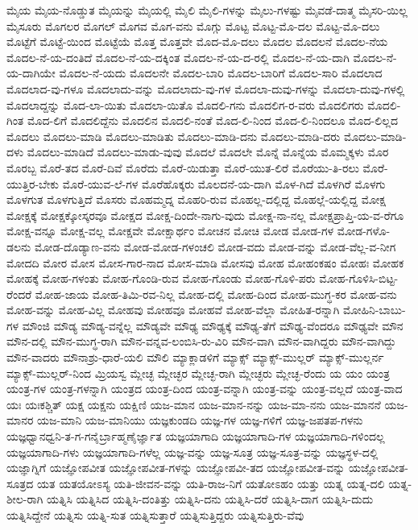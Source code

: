 {ಮೈಯ
ಮೈಯ-ನೊಡ್ಡುತ
ಮೈಯನ್ನು
ಮೈಯಲ್ಲಿ
ಮೈಲಿ
ಮೈಲಿ-ಗಳನ್ನು
ಮೈಲು-ಗಳಷ್ಟು
ಮೈವಡೆ-ದಾತ್ಮ
ಮೈಸರಿ-ಯಿಲ್ಲ
ಮೈಸೂರು
ಮೊಗಲರ
ಮೊಗಲ್
ಮೊಗವ
ಮೊಗ-ವನು
ಮೊಗ್ಗು
ಮೊಟ್ಟ
ಮೊಟ್ಟ-ಮೊ-ದಲ
ಮೊಟ್ಟ-ಮೊ-ದಲು
ಮೊಟ್ಟೆಗೆ
ಮೊಟ್ಟೆ-ಯಿಂದ
ಮೊಟ್ಟೆಯೆ
ಮೊತ್ತ
ಮೊತ್ತವೇ
ಮೊದ-ಮೊ-ದಲು
ಮೊದಲ
ಮೊದಲನೆ
ಮೊದಲ-ನೆಯ
ಮೊದಲ-ನೆ-ಯ-ದಂತಿದೆ
ಮೊದಲ-ನೆ-ಯ-ದಕ್ಕಿಂತ
ಮೊದಲ-ನೆ-ಯ-ದ-ರಲ್ಲಿ
ಮೊದಲ-ನೆ-ಯ-ದಾಗಿ
ಮೊದಲ-ನೆ-ಯ-ದಾಗಿಯೇ
ಮೊದಲ-ನೆ-ಯದು
ಮೊದಲನೇ
ಮೊದಲ-ಬಾರಿ
ಮೊದಲ-ಬಾರಿಗೆ
ಮೊದಲ-ಸಾರಿ
ಮೊದಲಾದ
ಮೊದಲಾದ-ವು-ಗಳೂ
ಮೊದಲಾದು-ವನ್ನು
ಮೊದಲಾದು-ವು-ಗಳ
ಮೊದಲಾ-ದುವು-ಗಳನ್ನು
ಮೊದಲಾ-ದುವು-ಗಳಲ್ಲಿ
ಮೊದಲಾದ್ದನ್ನು
ಮೊದ-ಲಾ-ಯಿತು
ಮೊದಲಾ-ಯಿತೊ
ಮೊದಲಿ-ಗನು
ಮೊದಲಿಗ-ರ-ವರು
ಮೊದಲಿಗರು
ಮೊದಲಿ-ಗಿಂತ
ಮೊದ-ಲಿಗೆ
ಮೊದಲಿದ್ದೆನು
ಮೊದಲಿನ
ಮೊದಲಿ-ನಂತೆ
ಮೊದ-ಲಿ-ನಿಂದ
ಮೊದ-ಲಿ-ನಿಂದಲೂ
ಮೊದ-ಲಿಲ್ಲದ
ಮೊದಲು
ಮೊದಲು-ಮಾಡಿ
ಮೊದಲು-ಮಾಡಿತು
ಮೊದಲು-ಮಾಡಿ-ದನು
ಮೊದಲು-ಮಾಡಿ-ದರು
ಮೊದಲು-ಮಾಡಿ-ದಳು
ಮೊದಲು-ಮಾಡಿದೆ
ಮೊದಲು-ಮಾಡು-ವುವು
ಮೊದಲೆ
ಮೊದಲೇ
ಮೊನ್ನೆ
ಮೊನ್ನೆಯ
ಮೊಮ್ಮಕ್ಕಳು
ಮೊರ
ಮೊರಬ್ಬ
ಮೊರೆ-ತದ
ಮೊರೆ-ದಿವೆ
ಮೊರೆದು
ಮೊರೆ-ಯಿಡುತ್ತಾ
ಮೊರೆ-ಯುತ-ಲಿರೆ
ಮೊರೆಯು-ತಿ-ರಲು
ಮೊರೆ-ಯುತ್ತಿರ-ಬೇಕು
ಮೊರೆ-ಯುವ-ಲೆ-ಗಳ
ಮೊರೆಹೊಕ್ಕರು
ಮೊಲದನೆ-ಯ-ದಾಗಿ
ಮೊಳ-ಗಿದೆ
ಮೊಳಗಿರೆ
ಮೊಳಗು
ಮೊಳಗುತ
ಮೊಳಗುತ್ತಿದೆ
ಮೊಸರು
ಮೊಹಮ್ಮದ್ನ
ಮೊಹರಿ-ರುವ
ಮೊಹಲ್ಲ-ದಲ್ಲಿದ್ದ
ಮೊಹಲ್ಲೆ-ಯಲ್ಲಿದ್ದ
ಮೋಕ್ಷ
ಮೋಕ್ಷಕ್ಕೆ
ಮೋಕ್ಷಕ್ಕೋಸ್ಕರವೂ
ಮೋಕ್ಷದ
ಮೋಕ್ಷ-ದಿಂದೇ-ನಾಗು-ವುದು
ಮೋಕ್ಷ-ನಾ-ನಲ್ಲ
ಮೋಕ್ಷಪ್ರಾಪ್ತಿ-ಯ-ವ-ರೆಗೂ
ಮೋಕ್ಷ-ವನ್ನೂ
ಮೋಕ್ಷ-ವಲ್ಲ
ಮೋಕ್ಷವೇ
ಮೋಕ್ಷಾರ್ಥಂ
ಮೋಚನ
ಮೋಚಿ
ಮೋಡ
ಮೋಡ-ಗಳ
ಮೋಡ-ಗಳೊ-ಡಲನು
ಮೋಡ-ದೊಡ್ಯಾಣ-ವನು
ಮೋಡ-ಮೋಡ-ಗಳಂಚಲಿ
ಮೋಡ-ವದು
ಮೋಡ-ವನ್ನು
ಮೋಡ-ವೆಲ್ಲ-ವ-ನೀಗ
ಮೋದದಿ
ಮೋರ
ಮೋಸ
ಮೋಸ-ಗಾರ-ನಾದ
ಮೋಸ-ಮಾಡಿ
ಮೋಸವು
ಮೋಹ
ಮೋಹಂಕಷಂ
ಮೋಹಃ
ಮೋಹಕ
ಮೋಹಕ್ಕೆ
ಮೋಹ-ಗಳಂತು
ಮೋಹ-ಗೊಂಡಿ-ರುವ
ಮೋಹ-ಗೊಂಡು
ಮೋಹ-ಗೊಳಿ-ಪರು
ಮೋಹ-ಗೊಳಿಸಿ-ಬಿಟ್ಟ-ರೆಂದರೆ
ಮೋಹ-ಜಾಯ
ಮೋಹ-ತಿಮಿ-ರವ-ನಿಲ್ಲ
ಮೋಹ-ದಲ್ಲಿ
ಮೋಹ-ದಿಂದ
ಮೋಹ-ಮುಗ್ಧ-ಕರ
ಮೋಹ-ವನು
ಮೋಹ-ವನ್ನು
ಮೋಹ-ವಿಲ್ಲ
ಮೋಹವು
ಮೋಹವೂ
ಮೋಹವೆ
ಮೋಹ-ವೆಲ್ಲಾ
ಮೋಹಿತ-ರನ್ನಾಗಿ
ಮೋಹಿನಿ-ಬಾಬು-ಗಳ
ಮೌಂಜಿ
ಮೌಡ್ಯ
ಮೌಡ್ಯ-ವನ್ನೆಲ್ಲ
ಮೌಡ್ಯವೇ
ಮೌಢ್ಯ
ಮೌಢ್ಯಕ್ಕೆ
ಮೌಢ್ಯ-ತೆಗೆ
ಮೌಢ್ಯ-ವೆಂದರೂ
ಮೌಢ್ಯವೇ
ಮೌನ
ಮೌನ-ದಲ್ಲಿ
ಮೌನ-ಮುಗ್ಧ-ರಾಗಿ
ಮೌನ-ವನ್ನವ-ಲಂಬಿಸಿ-ರು-ವಿರಿ
ಮೌನ-ವಾಗಿ
ಮೌನ-ವಾಗಿದ್ದರು
ಮೌನ-ವಾಗಿದ್ದು
ಮೌನ-ವಾದರು
ಮೌನಾಶ್ರು-ಧಾರೆ-ಯಲಿ
ಮೌಲಿ
ಮ್ಯಾಕ್ಲಾಡಳಿಗೆ
ಮ್ಯಾಕ್ಸ್
ಮ್ಯಾಕ್ಸ್-ಮುಲ್ಲರ್
ಮ್ಯಾಕ್ಸ್-ಮುಲ್ಲರ್ನ
ಮ್ಯಾಕ್ಸ್-ಮುಲ್ಲರ್-ನಿಂದ
ಮ್ರಿಯಸ್ವ
ಮ್ಲೇಚ್ಛ
ಮ್ಲೇಚ್ಛರ
ಮ್ಲೇಚ್ಛ-ರಾಗಿ
ಮ್ಲೇಚ್ಛರು
ಮ್ಲೇಚ್ಛ-ರೆಂದು
ಯ
ಯಂ
ಯಂತ್ರ
ಯಂತ್ರ-ಗಳ
ಯಂತ್ರ-ಗಳನ್ನಾಗಿ
ಯಂತ್ರದ
ಯಂತ್ರ-ದಿಂದ
ಯಂತ್ರ-ವನ್ನಾಗಿ
ಯಂತ್ರ-ವನ್ನು
ಯಂತ್ರ-ವಲ್ಲದೆ
ಯಂತ್ರ-ವಾದ
ಯಃ
ಯಃಕಶ್ಚಿತ್
ಯಕ್ಷ
ಯಕ್ಷನು
ಯಕ್ಷಿಣಿ
ಯಜ-ಮಾನ
ಯಜ-ಮಾನ-ನನ್ನು
ಯಜ-ಮಾ-ನನು
ಯಜ-ಮಾನನೆ
ಯಜ-ಮಾನರ
ಯಜ-ಮಾನಿ
ಯಜ-ಮಾನಿಯು
ಯಜ್ಞಕುಂಡದಿ
ಯಜ್ಞ-ಗಳ
ಯಜ್ಞ-ಗಳಿಗೆ
ಯಜ್ಞ-ಜಪತಪ-ಗಳನು
ಯಜ್ಞಧ್ವಾನಧ್ವನಿ-ತ-ಗ-ಗನೈರ್ಬ್ರಾಹ್ಮಣೈರ್ಜ್ಞಾತ
ಯಜ್ಞಯಾಗಾದಿ
ಯಜ್ಞಯಾಗಾದಿ-ಗಳ
ಯಜ್ಞಯಾಗಾದಿ-ಗಳಿಂದಲ್ಲ
ಯಜ್ಞಯಾಗಾದಿ-ಗಳು
ಯಜ್ಞಯಾಗಾದಿ-ಗಳೆಲ್ಲ
ಯಜ್ಞ-ವನ್ನು
ಯಜ್ಞ-ಸೂತ್ರ
ಯಜ್ಞ-ಸೂತ್ರ-ವನ್ನು
ಯಜ್ಞಸ್ಥಳ-ದಲ್ಲಿ
ಯಜ್ಞಾಗ್ನಿಗೆ
ಯಜ್ಞೋಪವೀತ
ಯಜ್ಞೋಪವೀತ-ಗಳನ್ನು
ಯಜ್ಞೋಪವೀ-ತದ
ಯಜ್ಞೋಪವೀತ-ವನ್ನು
ಯಜ್ಞೋಪವೀತ-ಸೂತ್ರದ
ಯತ
ಯತಯೋಽಸ್ಯ
ಯತಿ-ಜೀವನ-ವನ್ನು
ಯತಿ-ರಾಜ-ನಿಗೆ
ಯತೋಽಹಂ
ಯತ್ತು
ಯತ್ನ
ಯತ್ನ-ದಲಿ
ಯತ್ನ-ಶೀಲ-ರಾಗಿ
ಯತ್ನಿಸಿ
ಯತ್ನಿಸಿದ
ಯತ್ನಿಸಿ-ದಂತಿತ್ತು
ಯತ್ನಿಸಿ-ದನು
ಯತ್ನಿಸಿ-ದರೆ
ಯತ್ನಿಸಿ-ದಾಗ
ಯತ್ನಿಸಿ-ದುದು
ಯತ್ನಿಸಿದ್ದೇನೆ
ಯತ್ನಿಸು
ಯತ್ನಿ-ಸುತ
ಯತ್ನಿಸುತ್ತಾರೆ
ಯತ್ನಿಸುತ್ತಿದ್ದರು
ಯತ್ನಿಸುತ್ತಿರು-ವೆವು
}
